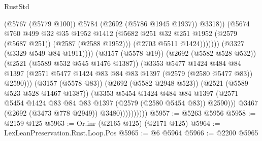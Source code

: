 \begin{lexlean}{RustStd}
\begin{coremodule}
{\begin{coremodule}
{{{{{{{{{{                                              (@5767 (@5779 @100))
                                              @5784
                                              (@2692 (@5786 @1945 @1937))
                                              @3318))
                                          (@5674
                                            @760
                                            @499
                                            @32
                                            @35
                                            @1952
                                            @1412
                                            (@5682
                                              @251
                                              @32
                                              @251
                                              @1952
                                              (@2579 (@5687 @251))
                                              (@2587 (@2588 @1952)))
                                            (@2703 @5511 @1424)))))))
                                (@3327 (@3329 @549 @84 @1911))))
                            (@3157 (@5578 @19))
                            (@2692 (@5582 @528 @532))
                            (@2521 (@5589 @532 @545 @1476 @1387))
                            (@3353
                              @5477
                              @1424
                              @484
                              @84
                              @1397
                              (@2571
                                @5477
                                @1424
                                @83
                                @84
                                @83
                                @1397
                                (@2579 (@2580 @5477 @83))
                                @2590)))
                          (@3157 (@5578 @83))
                          (@2692 (@5582 @2948 @523))
                          (@2521 (@5589 @523 @528 @1467 @1387))
                          (@3353
                            @5454
                            @1424
                            @484
                            @84
                            @1397
                            (@2571 @5454 @1424 @83 @84 @83 @1397 (@2579 (@2580 @5454 @83)) @2590)))
                        @3467
                        (@2692 (@3473 @778 @2949))
                        @3480))))))))))
@5957 := @5263 @5956
@5958 := @2159 @125
@5963 := Or.inr (@2165 @125) (@2171 @125)
@5964 := LexLeanPreservation.Rust.Loop.Pos
@5965 := @6 @5964
@5966 := @2200 @5965
}}}}}}}}}}
\end{coremodule}}
\end{coremodule}
\end{lexlean}
